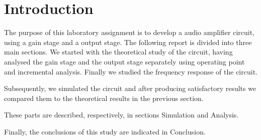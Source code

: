 \section{Introduction}
\label{sec:introduction}

The purpose of this laboratory assignment is to develop a audio amplifier 
circuit, using a gain stage and a output stage. 
The following report is divided into three main sections.
We started with the theoretical study of the circuit, having analysed
the gain stage and the output stage separately using operating point and 
incremental analysis. Finally we studied the frequency response of the circuit.

Subsequently, we simulated the circuit and after producing satisfactory 
results we compared them to the theoretical results in the previous section.

These parts are described, respectively, in sections Simulation 
and Analysis.

Finally, the conclusions of this study are indicated in Conclusion.


